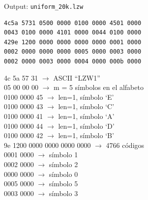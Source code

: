 \documentclass{beamer}
\theoremstyle{plain}
\theoremstyle{example}
\newtheorem{ejercicio} [Ejercicio]{Ejercicio}
\theoremstyle{example}
\begin{document}
\begin{frame}[fragile] {Output: \texttt{uniform\_20k.lzw}}
\footnotesize
\begin{verbatim}
4c5a 5731 0500 0000 0100 0000 4501 0000
0043 0100 0000 4101 0000 0044 0100 0000
429e 1200 0000 0000 0000 0000 0001 0000
0002 0000 0000 0000 0005 0000 0003 0000
0002 0000 0003 0000 0004 0000 000b 0000
\end{verbatim}
\footnotesize
4c 5a 57 31	$\rightarrow$ ASCII ``LZW1''\\
05 00 00 00	$\rightarrow$  m = 5 símbolos en el alfabeto\\
0100 0000 45 $\rightarrow$ len=1, símbolo `E'\\
0100 0000 43 $\rightarrow$ len=1, símbolo `C'\\
0100 0000 41 $\rightarrow$ len=1, símbolo `A'\\
0100 0000 44 $\rightarrow$ len=1, símbolo `D'\\
0100 0000 42 $\rightarrow$ len=1, símbolo `B'\\
9e 1200 0000 0000 0000 0000 $\rightarrow$ 4766 códigos\\
0001 0000 $\rightarrow$ símbolo 1\\
0002 0000 $\rightarrow$ símbolo 2\\
0000 0000 $\rightarrow$ símbolo 0\\
0005 0000 $\rightarrow$ símbolo 5\\
0003 0000 $\rightarrow$ símbolo 3\\

\end{frame}     




\end{document}
